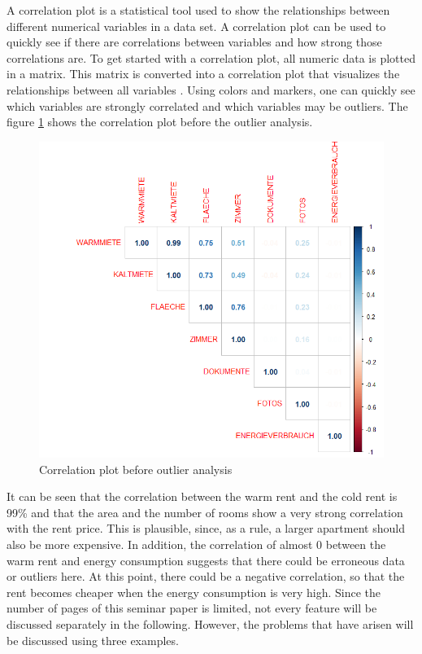A correlation plot is a statistical tool used to show the relationships between different numerical variables in a data set. A correlation plot can be used to quickly see if there are correlations between variables and how strong those correlations are. To get started with a correlation plot, all numeric data is plotted in a matrix. This matrix is converted into a correlation plot that visualizes the relationships between all variables \cite{Korrelations Matrizen}. Using colors and markers, one can quickly see which variables are strongly correlated and which variables may be outliers. The figure \ref{fig: korrelationVorher}  shows the correlation plot before the outlier analysis. 

\begin{figure}[h!]
	\centering
	\includegraphics[width=0.7\linewidth]{img/korrelationVorher}
	\caption{Correlation plot before outlier analysis}
	\label{fig: korrelationVorher}
\end{figure}

It can be seen that the correlation between the warm rent and the cold rent is 99\% and that the area and the number of rooms show a very strong correlation with the rent price. This is plausible, since, as a rule, a larger apartment should also be more expensive. In addition, the correlation of almost 0 between the warm rent and energy consumption suggests that there could be erroneous data or outliers here. At this point, there could be a negative correlation, so that the rent becomes cheaper when the energy consumption is very high. Since the number of pages of this seminar paper is limited, not every feature will be discussed separately in the following. However, the problems that have arisen will be discussed using three examples. 


